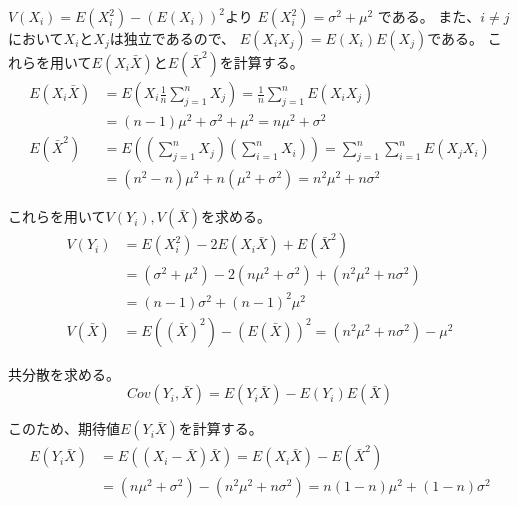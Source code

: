 \documentclass[12pt,b5paper]{ltjsarticle}
\begin{document}
\begin{enumerate}
\begin{enumerate}
            $V(X_{i})=E(X_{i}^{2})-(E(X_{i}))^{2}$より
            $E(X_{i}^{2}) = \sigma^{2} + \mu^{2}$
            である。
            また、$i\ne j$において$X_{i}$と$X_{j}$は独立であるので、
            $E(X_{i}X_{j})=E(X_{i})E(X_{j})$である。
            これらを用いて$E(X_{i}\bar{X})$と$E(\bar{X}^{2})$を計算する。
            \begin{align}
             E(X_{i}\bar{X})
             &= E \left( X_{i} \frac{1}{n}\sum_{j=1}^{n}X_{j} \right)
             = \frac{1}{n} \sum_{j=1}^{n} E \left( X_{i}X_{j} \right)\\
             &= (n-1)\mu^{2} + \sigma^{2} + \mu^{2}
             = n\mu^{2} + \sigma^{2}
             \\
             E(\bar{X}^{2})
             &= E \left( \left( \sum_{j=1}^{n}X_{j}\right) \left( \sum_{i=1}^{n}X_{i} \right) \right)
             = \sum_{j=1}^{n} \sum_{i=1}^{n} E(X_{j}X_{i})\\
             &= (n^{2}-n)\mu^{2} + n(\mu^{2} + \sigma^{2})
             = n^{2}\mu^{2} + n\sigma^{2}
            \end{align}

            これらを用いて$V(Y_{i}),V(\bar{X})$を求める。
            \begin{align}
             V(Y_{i})
             &= E(X_{i}^{2})-2E(X_{i}\bar{X})+E(\bar{X}^{2})\\
             &= (\sigma^{2}+\mu^{2}) -2(n\mu^{2} + \sigma^{2}) + (n^{2}\mu^{2} + n\sigma^{2})\\
             &= (n-1)\sigma^{2} + (n-1)^{2}\mu^{2}\\
             V(\bar{X})
             &= E((\bar{X})^{2}) - (E(\bar{X}))^{2}
             = (n^{2}\mu^{2} + n\sigma^{2}) - \mu^{2}
            \end{align}

            共分散を求める。
            \begin{equation}
             Cov(Y_{i},\bar{X}) = E(Y_{i}\bar{X}) - E(Y_{i})E(\bar{X})
            \end{equation}

            このため、期待値$E(Y_{i}\bar{X})$を計算する。
            \begin{align}
             E(Y_{i}\bar{X})
              &= E\left( (X_{i}-\bar{X})\bar{X} \right)
              = E(X_{i}\bar{X})-E(\bar{X}^{2})\\
              &= (n\mu^{2} + \sigma^{2} ) - (n^{2}\mu^{2} + n\sigma^{2})
              = n(1-n)\mu^{2}+(1-n)\sigma^{2}
            \end{align}


\end{enumerate}
\end{enumerate}
\end{document}

